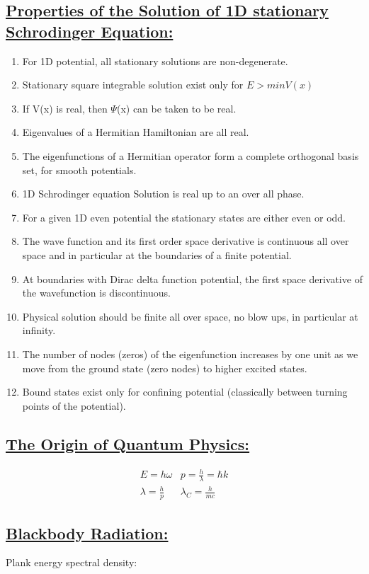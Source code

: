 \documentclass[a4paper,12pt]{article}
\begin{document}
\subsection*{\underline{Properties of the Solution of 1D stationary Schrodinger Equation:}}
\begin{enumerate}
\item For 1D potential, all stationary solutions are non-degenerate.
\item Stationary square integrable solution exist only for $E > min{V(x)}$ 
\item If V(x) is real, then $\Psi$(x) can be taken to be real.
\item Eigenvalues of a Hermitian Hamiltonian are all real.
\item The eigenfunctions of a Hermitian operator form a complete orthogonal basis set, for smooth potentials.
\item 1D Schrodinger equation Solution is real up to an over all phase.
\item For a given 1D even potential the stationary states are either even or odd.
\item The wave function and its first order space derivative is continuous all over space and in particular at the boundaries of a finite potential.
\item At boundaries with Dirac delta function potential, the first space derivative of the wavefunction is discontinuous. 
\item Physical solution should be finite all over space, no blow ups, in particular at infinity.
\item The number of nodes (zeros) of the eigenfunction increases by one unit as we move from the ground state (zero nodes) to higher excited states.
\item Bound states exist only for confining potential (classically between turning points of the potential).
\end{enumerate}
\subsection*{\underline{The Origin of Quantum Physics:}}
\begin{align}
    &E=h\omega
    &p=\frac{h}{\lambda}=\hbar k
    &\\
    &\lambda=\frac{h}{p}
    &\lambda_C = \frac{h}{mc}
\end{align}
\subsection*{\underline{Blackbody Radiation:}}
Plank energy spectral density: 
\vspace{0.3cm}
\end{document}
